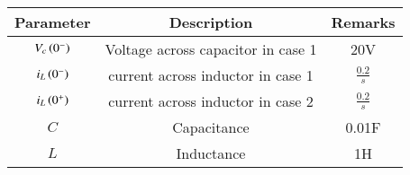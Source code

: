 \setlength{\arrayrulewidth}{0.3mm}
\setlength{\tabcolsep}{20pt}
\renewcommand{\arraystretch}{1.3}



\begin{tabular}{|c|c|c|}
\hline

Parameter& Description & Remarks\\
\hline
$V_c\left(0^{-}\right)$ & Voltage across capacitor in case 1 & 20V\\
\hline
$i_L \left(0^-\right)$ & current across inductor in case 1  & $\frac{0.2}{s} $  \\
\hline
$i_L \left(0^+\right)$ & current across inductor in case 2 & $\frac{0.2}{s} $\\
\hline
$C$ & Capacitance & 0.01F\\
\hline
$L$ & Inductance & 1H\\
\hline

\end{tabular}

